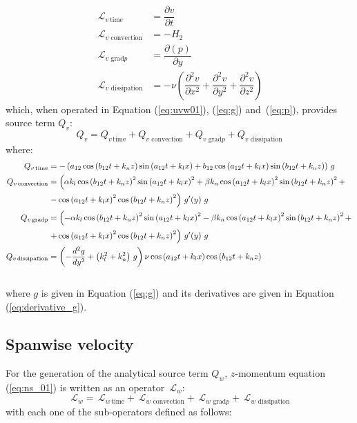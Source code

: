 \documentclass[10pt]{article}
\newcommand{\Diff}[2] {\dfrac{\partial( #1)}{\partial #2}}
\newcommand{\diff}[2] {\dfrac{\partial #1}{\partial #2}}
\newcommand{\Lo}{\,\mathcal{L}}
\newcommand{\convection}{\,\text{convection}}
\newcommand{\gradp}{\,\text{grad}p}
\newcommand{\dissipation}{\,\text{dissipation}}
\begin{document}
\begin{equation}
 \begin{split}
\Lo_{v \, \text{time}}&= \diff{v}{t}  \\
\Lo_{v \, \convection}&= -H_2\\
\Lo_{v \, \gradp }&= \Diff{p}{y}\\
\Lo_{v \, \dissipation }&= - \nu\left(\diff{^2 v}{ x^2}+\diff{^2 v}{ y^2}+\diff{^2 v}{ z^2} \right)
 \end{split}
\end{equation}
%
which, when operated in Equation (\ref{eq:uvw01}),  (\ref{eq:g}) and~(\ref{eq:p}), provides source term $Q_{v}$:
\begin{equation*} 
Q_v = Q_{v \, \text{time}}+Q_{v \, \convection}+Q_{v \, \gradp }+Q_{v \, \dissipation }
\end{equation*}
where:
\begin{equation*}
\begin{split}
Q_{v \,\text{time}} &=-\left(a_{12} \cos\left(b_{12} t+k_n z\right) \sin\left(a_{12} t+k_l x\right)+b_{12} \cos\left(a_{12} t+k_l x\right) \sin\left(b_{12} t+k_n z\right)\right) \, g\\
%
 Q_{v \convection} &= \left(\alpha k_l \cos\left(b_{12} t+k_n z\right)^2 \sin\left(a_{12} t+k_l x\right)^2+\beta k_n \cos\left(a_{12} t+k_l x\right)^2 \sin\left(b_{12} t+k_n z\right)^2 +\right.\\
	&\left.-\cos\left(a_{12} t+k_l x\right)^2 \cos\left(b_{12} t+k_n z\right)^2\right) \, g'(y) \,\, g\\
%
Q_{v \gradp} &= \left(-\alpha k_l \cos\left(b_{12} t+k_n z\right)^2 \sin\left(a_{12} t+k_l x\right)^2-\beta k_n \cos\left(a_{12} t+k_l x\right)^2 \sin\left(b_{12} t+k_n z\right)^2+\right.\\
	&\left.+\cos\left(a_{12} t+k_l x\right)^2 \cos\left(b_{12} t+k_n z\right)^2\right) \, g'(y) \,\, g\\
%
 Q_{v \dissipation} &=\left(-\frac{d^2g}{dy^2}+\left(k_l^2+k_n^2\right) \, g\right) \nu \cos\left(a_{12} t+k_l x\right) \cos\left(b_{12} t+k_n z\right)\\\vspace{8pt}
\end{split}
\end{equation*}
where $g$ is given in Equation (\ref{eq:g}) and its derivatives are given in Equation (\ref{eq:derivative_g}).

\subsection{Spanwise velocity}
For the generation of the analytical source term $Q_w$, $z$-momentum equation (\ref{eq:ns_01}) is written as an operator $\Lo_w$:
 $$\Lo_w = \Lo_{w \, \text{time}}+\Lo_{w \, \convection}+\Lo_{w \, \gradp }+\Lo_{w \, \dissipation }$$
with each one of the sub-operators defined as follows:
\end{document}
